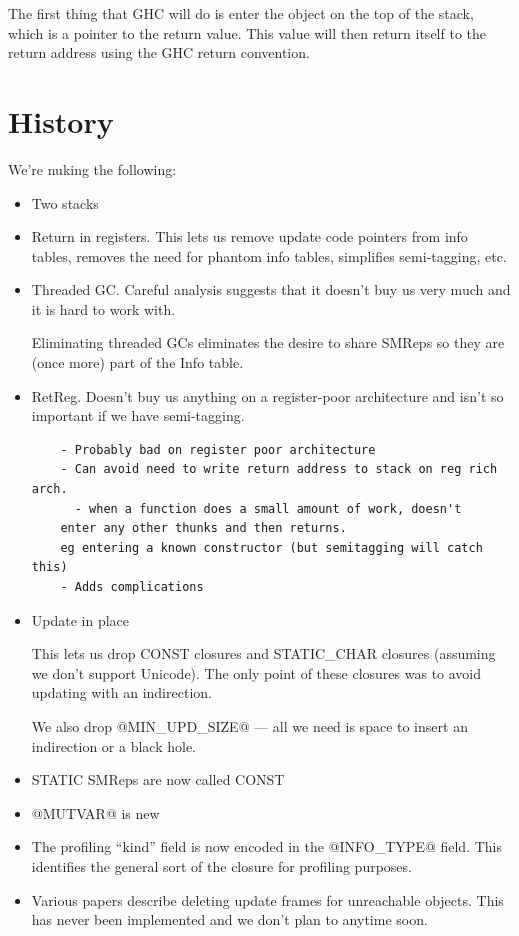 \documentclass[11pt]{article}
\begin{document}
The first thing that GHC will do is enter the object on the top of the
stack, which is a pointer to the return value.  This value will then
return itself to the return address using the GHC return convention.


\fi


\part{History}

We're nuking the following:

\begin{itemize}
\item
  Two stacks

\item
  Return in registers.
  This lets us remove update code pointers from info tables,
  removes the need for phantom info tables, simplifies 
  semi-tagging, etc.

\item
  Threaded GC.
  Careful analysis suggests that it doesn't buy us very much
  and it is hard to work with.

  Eliminating threaded GCs eliminates the desire to share SMReps
  so they are (once more) part of the Info table.

\item
  RetReg.
  Doesn't buy us anything on a register-poor architecture and
  isn't so important if we have semi-tagging.

\begin{verbatim}
    - Probably bad on register poor architecture 
    - Can avoid need to write return address to stack on reg rich arch.
      - when a function does a small amount of work, doesn't 
  	enter any other thunks and then returns.
  	eg entering a known constructor (but semitagging will catch this)
    - Adds complications
\end{verbatim}

\item
  Update in place

  This lets us drop CONST closures and STATIC_CHAR closures (assuming we
  don't support Unicode).  The only point of these closures was to 
  avoid updating with an indirection.

  We also drop @MIN_UPD_SIZE@ --- all we need is space to insert an
  indirection or a black hole.

\item
  STATIC SMReps are now called CONST

\item
  @MUTVAR@ is new

\item The profiling ``kind'' field is now encoded in the @INFO_TYPE@ field.
This identifies the general sort of the closure for profiling purposes.

\item Various papers describe deleting update frames for unreachable objects.
  This has never been implemented and we don't plan to anytime soon.

\end{itemize}
\end{document}
